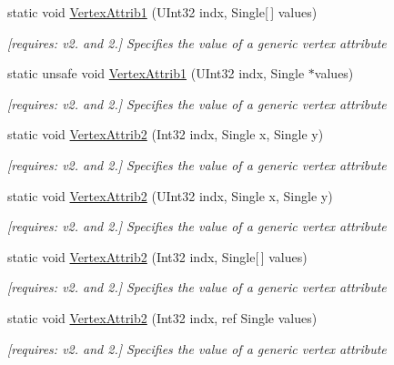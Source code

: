 \begin{DoxyCompactItemize}
static void \hyperlink{class_open_t_k_1_1_graphics_1_1_e_s20_1_1_g_l_a29fece3810dde921eaa86cc46d7dab8b}{Vertex\-Attrib1} (U\-Int32 indx, Single\mbox{[}$\,$\mbox{]} values)
\begin{DoxyCompactList}\small\item\em \mbox{[}requires\-: v2. and 2.\mbox{]} Specifies the value of a generic vertex attribute \end{DoxyCompactList}\item 
static unsafe void \hyperlink{class_open_t_k_1_1_graphics_1_1_e_s20_1_1_g_l_a02611f773d00f3a530b8bd1dbea63f8c}{Vertex\-Attrib1} (U\-Int32 indx, Single $\ast$values)
\begin{DoxyCompactList}\small\item\em \mbox{[}requires\-: v2. and 2.\mbox{]} Specifies the value of a generic vertex attribute \end{DoxyCompactList}\item 
static void \hyperlink{class_open_t_k_1_1_graphics_1_1_e_s20_1_1_g_l_a7cb233c2f194f998a243be7a60648213}{Vertex\-Attrib2} (Int32 indx, Single x, Single y)
\begin{DoxyCompactList}\small\item\em \mbox{[}requires\-: v2. and 2.\mbox{]} Specifies the value of a generic vertex attribute \end{DoxyCompactList}\item 
static void \hyperlink{class_open_t_k_1_1_graphics_1_1_e_s20_1_1_g_l_a4e50174726ee65b58f48372da2ed668e}{Vertex\-Attrib2} (U\-Int32 indx, Single x, Single y)
\begin{DoxyCompactList}\small\item\em \mbox{[}requires\-: v2. and 2.\mbox{]} Specifies the value of a generic vertex attribute \end{DoxyCompactList}\item 
static void \hyperlink{class_open_t_k_1_1_graphics_1_1_e_s20_1_1_g_l_ae5e997948f02be84854248827f44afd7}{Vertex\-Attrib2} (Int32 indx, Single\mbox{[}$\,$\mbox{]} values)
\begin{DoxyCompactList}\small\item\em \mbox{[}requires\-: v2. and 2.\mbox{]} Specifies the value of a generic vertex attribute \end{DoxyCompactList}\item 
static void \hyperlink{class_open_t_k_1_1_graphics_1_1_e_s20_1_1_g_l_a51c94a56d7333b86ac853862d06b4de7}{Vertex\-Attrib2} (Int32 indx, ref Single values)
\begin{DoxyCompactList}\small\item\em \mbox{[}requires\-: v2. and 2.\mbox{]} Specifies the value of a generic vertex attribute \end{DoxyCompactList}\item 

\end{DoxyCompactItemize}
